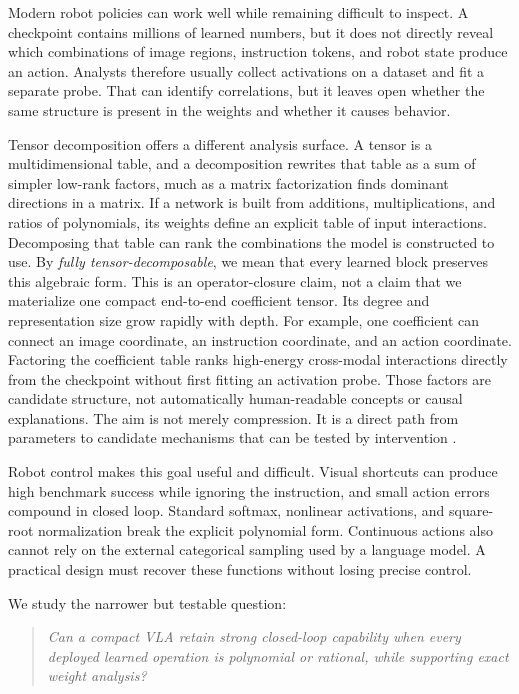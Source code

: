 \documentclass{article}
\begin{document}
Modern robot policies can work well while remaining difficult to inspect. A checkpoint contains
millions of learned numbers, but it does not directly reveal which combinations of image regions,
instruction tokens, and robot state produce an action. Analysts therefore usually collect
activations on a dataset and fit a separate probe. That can identify correlations, but it leaves
open whether the same structure is present in the weights and whether it causes behavior.

Tensor decomposition offers a different analysis surface. A tensor is a multidimensional table,
and a decomposition rewrites that table as a sum of simpler low-rank factors, much as a matrix
factorization finds dominant directions in a matrix. If a network is built from additions,
multiplications, and ratios of polynomials, its weights define an explicit table of input
interactions. Decomposing that table can rank the combinations the model is constructed to use.
By \emph{fully tensor-decomposable}, we mean that every learned block preserves this algebraic
form. This is an operator-closure claim, not a claim that we materialize one compact end-to-end
coefficient tensor. Its degree and representation size grow rapidly with depth. For example, one
coefficient can connect an image coordinate, an instruction coordinate, and an action coordinate.
Factoring the coefficient table ranks high-energy cross-modal interactions directly from the
checkpoint without first fitting an activation probe. Those factors are candidate structure, not
automatically human-readable concepts or causal explanations. The aim is not merely compression.
It is a direct path from parameters to candidate mechanisms that can be tested by intervention
\cite{pearce,chinets}.

Robot control makes this goal useful and difficult. Visual shortcuts can produce high benchmark
success while ignoring the instruction, and small action errors compound in closed loop.
Standard softmax, nonlinear activations, and square-root normalization break the explicit
polynomial form. Continuous actions also cannot rely on the external categorical sampling used
by a language model. A practical design must recover these functions without losing precise
control.

We study the narrower but testable question:

\begin{quote}
\emph{Can a compact VLA retain strong closed-loop capability when every deployed learned
operation is polynomial or rational, while supporting exact weight analysis?}
\end{quote}
\end{document}
